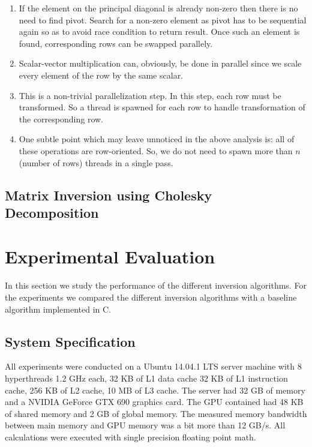 \documentclass[11pt]{article}
\begin{document}
\begin{enumerate}
        \item If the element on the principal diagonal is already non-zero then there is no need to find pivot. Search for a non-zero element as pivot has to be sequential again so as to avoid race condition to return result. Once such an element is found, corresponding rows can be swapped parallely.
        \item Scalar-vector multiplication can, obviously, be done in parallel since we scale every element of the row by the same scalar.
        \item This is a non-trivial parallelization step. In this step, each row must be transformed. So a thread is spawned for each row to handle transformation of the corresponding row.
		\item One subtle point which may leave unnoticed in the above analysis is: all of these operations are row-oriented. So, we do not need to spawn more than $n$(number of rows) threads in a single pass.
\end{enumerate}
\subsection{Matrix Inversion using Cholesky Decomposition}

\section{Experimental Evaluation}

In this section we study the performance of the different inversion algorithms. For the experiments we compared the different inversion algorithms with a baseline algorithm implemented in C.

\subsection{System Specification}

All experiments were conducted on a Ubuntu 14.04.1 LTS server machine with 8 hyperthreads 1.2 GHz each, 32 KB of L1 data cache 32 KB of L1 instruction cache, 256 KB of L2 cache, 10 MB of L3 cache. The server had 32 GB of memory and a NVIDIA GeForce GTX 690 graphics card. The GPU contained had 48 KB of shared  memory and 2 GB of global memory. The measured memory bandwidth between main memory and GPU memory was a bit more than 12 GB/s. All calculations were executed with single precision floating point math.
\end{document}
